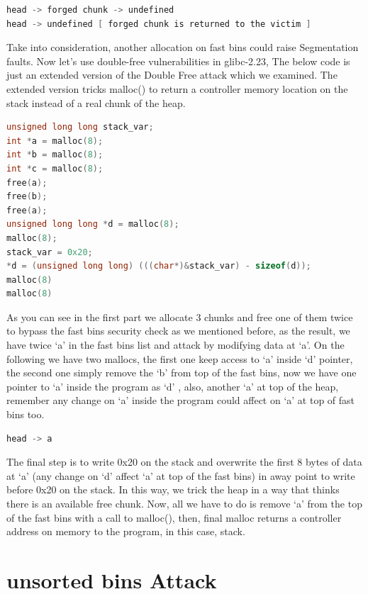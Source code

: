 \documentclass{masterthesis}
\newcommand*\libc{glibc}
\newcommand*\fb{fast bins}
\newcommand*\ub{unsorted bins}
\begin{document}
\begin{lstlisting}[language=c,frame=tlrb]
head -> forged chunk -> undefined
head -> undefined [ forged chunk is returned to the victim ]
\end{lstlisting}

Take into consideration, another allocation on \fb{} could raise Segmentation faults.
Now let’s use double-free vulnerabilities in \libc{-2.23}, The below code is just an extended version of the Double Free attack which we examined. The extended version tricks malloc() to return a controller memory location on the stack instead of a real chunk of the heap. 

\begin{lstlisting}[language=c,frame=tlrb]
unsigned long long stack_var;
int *a = malloc(8);
int *b = malloc(8);
int *c = malloc(8);
free(a);
free(b);
free(a);
unsigned long long *d = malloc(8);
malloc(8);
stack_var = 0x20;
*d = (unsigned long long) (((char*)&stack_var) - sizeof(d));
malloc(8)
malloc(8)
\end{lstlisting}

As you can see in the first part we allocate 3 chunks and free one of them twice to bypass the \fb{} security check as we mentioned before, as the result, we have twice ‘a’ in the \fb{} list and attack by modifying data at ‘a’. On the following we have two mallocs, the first one keep access to ‘a’ inside ‘d’ pointer, the second one simply remove the ‘b’ from top of the \fb{}, now we have one pointer to ‘a’ inside the program as ‘d’ , also, another ‘a’ at top of the heap, remember any change on ‘a’ inside the program could affect on ‘a’ at top of \fb{} too.

\begin{lstlisting}[language=c,frame=tlrb]
head -> a 
\end{lstlisting}

The final step is to write 0x20 on the stack and overwrite the first 8 bytes of data at ‘a’ (any change on ‘d’ affect ‘a’ at top of the \fb{}) in away point to write before 0x20 on the stack. In this way, we trick the heap in a way that thinks there is an available free chunk.
 Now, all we have to do is remove ‘a’ from the top of the \fb{} with a call to malloc(), then, final malloc returns a controller address on memory to the program, in this case, stack.

\section{\ub{} Attack}
\end{document}
